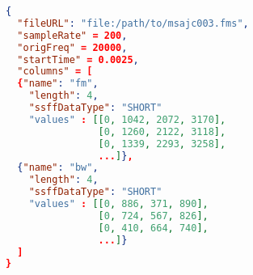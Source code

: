 \documentclass[A4,12pt, utf8, landscape]{article}
\begin{document}
\begin{lstlisting}[caption=internal derived signal representation,label=idsr, language=json,firstnumber=1]
{
  "fileURL": "file:/path/to/msajc003.fms",
  "sampleRate" = 200,
  "origFreq" = 20000,
  "startTime" = 0.0025,
  "columns" = [
  {"name": "fm",
    "length": 4,
    "ssffDataType": "SHORT"
    "values" : [[0, 1042, 2072, 3170],
                [0, 1260, 2122, 3118],
                [0, 1339, 2293, 3258],
                ...]},
  {"name": "bw",
    "length": 4,
    "ssffDataType": "SHORT"
    "values" : [[0, 886, 371, 890],
                [0, 724, 567, 826],
                [0, 410, 664, 740],
                ...]}
  ]
}
\end{lstlisting}

\end{document}
